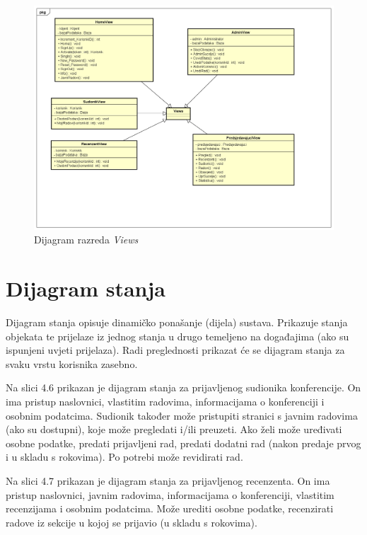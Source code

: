 				\newpage

				\begin{figure}[H]
					\includegraphics[width= 15 cm, keepaspectratio]{dijagrami/DijagramRazredaViews.png} 
					\centering
					\caption{Dijagram razreda \textit{Views} }
					\label{fig:DijagramViews}
				\end{figure}
			
			\eject
		
		\section{Dijagram stanja}
			
			
			Dijagram stanja opisuje dinamičko ponašanje (dijela) sustava. Prikazuje stanja objekata te prijelaze iz jednog stanja u drugo temeljeno na događajima (ako su ispunjeni uvjeti prijelaza).
			Radi preglednosti prikazat će se dijagram stanja za svaku vrstu korisnika zasebno.
			
			Na slici 4.6 prikazan je dijagram stanja za prijavljenog sudionika konferencije. On ima pristup naslovnici, vlastitim radovima, informacijama o konferenciji i osobnim podatcima. Sudionik također može pristupiti stranici s javnim radovima (ako su dostupni), koje može pregledati i/ili preuzeti. Ako želi može uređivati osobne podatke, predati prijavljeni rad, predati dodatni rad (nakon predaje prvog i u skladu s rokovima). Po potrebi može revidirati rad.
			
			Na slici 4.7 prikazan je dijagram stanja za prijavljenog recenzenta. On ima pristup naslovnici,
			javnim radovima, informacijama o konferenciji, vlastitim recenzijama i osobnim podatcima. Može urediti osobne podatke, recenzirati radove iz sekcije u kojoj se prijavio (u skladu s rokovima).
			
